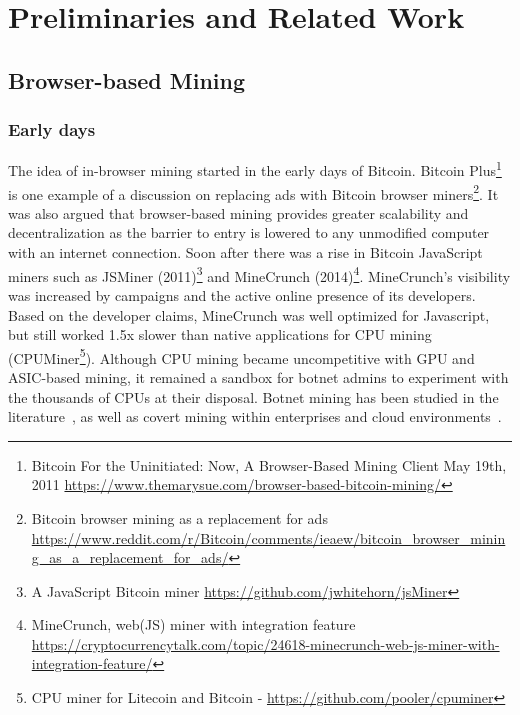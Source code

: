 %
%
%
%
%
%

\section{Preliminaries and Related Work}

\subsection{Browser-based Mining}\label{sec:mininghistory}

\subsubsection{Early days}
The idea of in-browser mining started in the early days of Bitcoin. Bitcoin Plus\footnote{Bitcoin For the Uninitiated: Now, A Browser-Based Mining Client  May 19th, 2011 \url{https://www.themarysue.com/browser-based-bitcoin-mining/}} is one example of a discussion on replacing ads with Bitcoin browser miners\footnote{Bitcoin browser mining as a replacement for ads \url{https://www.reddit.com/r/Bitcoin/comments/ieaew/bitcoin_browser_mining_as_a_replacement_for_ads/}}. It was also argued that browser-based mining provides greater scalability and decentralization as the barrier to entry is lowered to any unmodified computer with an internet connection. Soon after there was a rise in Bitcoin JavaScript miners such as JSMiner (2011)\footnote{A JavaScript Bitcoin miner \url{https://github.com/jwhitehorn/jsMiner}} and MineCrunch (2014)\footnote{MineCrunch, web(JS) miner with integration feature \url{https://cryptocurrencytalk.com/topic/24618-minecrunch-web-js-miner-with-integration-feature/}}. MineCrunch's visibility was increased by campaigns and the active online presence of its developers. Based on the developer claims, MineCrunch was well optimized for Javascript, but still worked 1.5x slower than native applications for CPU mining (\eg CPUMiner\footnote{CPU miner for Litecoin and Bitcoin - \url{https://github.com/pooler/cpuminer}}). Although CPU mining became uncompetitive with GPU and ASIC-based mining, it remained a sandbox for botnet admins to experiment with the thousands of CPUs at their disposal. Botnet mining has been studied in the literature~\cite{huang2014botcoin,wyke2012zeroaccess}, as well as covert mining within enterprises and cloud environments~\cite{MiningonSOeDime2017}.

